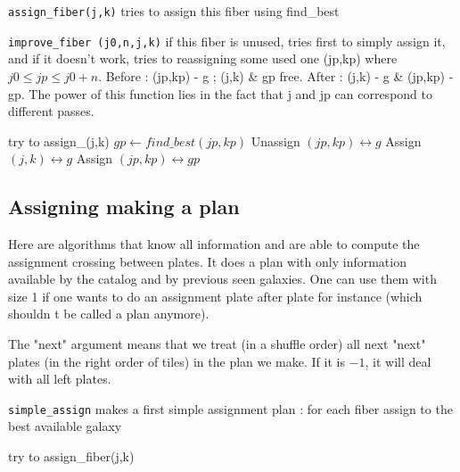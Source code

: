 \documentclass[10pt]{extarticle}
\begin{document}
\begin{multicols}{2}
{\tt assign\_fiber(j,k)} tries to assign this fiber using find\_best

{\tt improve\_fiber (j0,n,j,k)} if this fiber is unused, tries first to simply assign it, and if it doesn't work, tries to reassigning some used one (jp,kp) where $j0\le jp \le j0+n$. Before : (jp,kp) - g ; (j,k) \& gp free. After : (j,k) - g \& (jp,kp) - gp. The power of this function lies in the fact that j and jp can correspond to different passes.

\begin{algorithm}[H]
	\caption{Improve\_fiber(j0,n,j,k)}\label{euclid}
	\begin{algorithmic}[1]
		\State try to assign\_(j,k)
		\State $gp\leftarrow find\_best(jp,kp)$
		\State Unassign $(jp,kp) \longleftrightarrow g$
		\State Assign $(j,k) \longleftrightarrow g$
		\State Assign $(jp,kp) \longleftrightarrow gp$
		\EndIf
		\EndFor
		\EndIf
		\EndFor
		\EndIf
		\EndIf
	\end{algorithmic}
\end{algorithm}


\subsection{Assigning making a plan}
Here are algorithms that know all information and are able to compute the assignment crossing between plates. It does a plan with only information available by the catalog and by previous seen galaxies. One can use them with size 1 if one wants to do an assignment plate after plate for instance (which shouldn t be called a plan anymore).

The "next" argument means that we treat (in a shuffle order) all next "next" plates (in the right order of tiles) in the plan we make. If it is $-1$, it will deal with all left plates.

{\tt simple\_assign} makes a first simple assignment plan : for each fiber assign to the best available galaxy

\begin{algorithm}[H]
	\caption{Simple\_assign(j0,n)}\label{euclid}
	\begin{algorithmic}[1]
		\State try to assign\_fiber(j,k)
		\EndFor
		\EndFor
	\end{algorithmic}
\end{algorithm}


\end{multicols}
\end{document}
